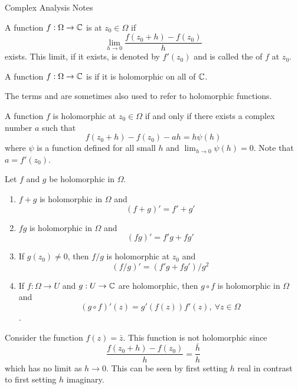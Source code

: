 \documentclass{mathnotes}
\begin{document}
\begin{center}
  \vspace*{20pt}
  \LARGE{Complex Analysis Notes}
\end{center}

\begin{bdefi}
  A function $f:\Omega\to\mathbb{C}$ is  at $z_0\in\Omega$ if
  $$\lim_{h\to0}\frac{f(z_0+h)-f(z_0)}{h}$$
  exists. This limit, if it exists, is denoted by $f'(z_0)$ and is called the
   of $f$ at $z_0$.
\end{bdefi}

\begin{defi}
  A function $f:\Omega\to\mathbb{C}$ is  if it is holomorphic on all of
  $\mathbb{C}$.
\end{defi}

\begin{defi}
  The terms  and  are sometimes
  also used to refer to holomorphic functions.
\end{defi}

\begin{prop}
  A function $f$ is holomorphic at $z_0\in\Omega$ if and only if there exists a
  complex number $a$ such that
  $$f(z_0+h)-f(z_0)-ah=h\psi(h)$$
  where $\psi$ is a function defined for all small $h$ and
  $\lim_{h\to0}\psi(h)=0$. Note that $a=f'(z_0)$.
\end{prop}

\begin{prop}
  Let $f$ and $g$ be holomorphic in $\Omega$.
  \begin{enumerate}
    \item $f+g$ is holomorphic in $\Omega$ and
      $$(f+g)'=f'+g'$$
    \item $fg$ is holomorphic in $\Omega$ and
      $$(fg)'=f'g+fg'$$
    \item If $g(z_0)\ne0$, then $f/g$ is holomorphic at $z_0$ and
      $$(f/g)'=(f'g+fg')/g^2$$
    \item If $f:\Omega\to U$ and $g:U\to\mathbb{C}$ are holomorphic, then $g\circ f$
      is holomorphic in $\Omega$ and $$(g\circ f)'(z)=g'(f(z))f'(z),\ \forall
      z\in\Omega$$.
  \end{enumerate}
\end{prop}

\begin{ex}
  Consider the function $f(z)=\bar z$. This function is not holomorphic since
  $$\frac{f(z_0+h)-f(z_0)}{h}=\frac{\bar h}{h}$$
  which has no limit as $h\to0$. This can be seen by first setting $h$ real in
  contrast to first setting $h$ imaginary.
\end{ex}
\end{document}
